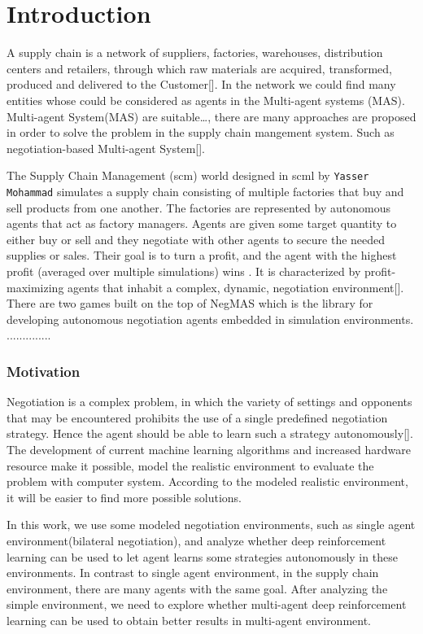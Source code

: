 \chapter{Introduction}
A supply chain is a network of suppliers, factories, warehouses, distribution centers and retailers, through which raw materials are acquired, transformed, produced and delivered to the Customer[]. In the network we could find many entities whose could be considered as agents in the Multi-agent systems (MAS). Multi-agent System(MAS) are suitable…, there are many approaches are proposed in order to solve the problem in the supply chain mangement system. Such as negotiation-based Multi-agent System[].

The Supply Chain Management (\gls{scm}) world designed in \gls{scml} by \texttt{Yasser Mohammad} simulates a supply chain consisting of multiple factories that buy and sell products from one another. The factories are represented by autonomous agents that act as factory managers. Agents are given some target quantity to either buy or sell and they negotiate with other agents to secure the needed supplies or sales. Their goal is to turn a profit, and the agent with the highest profit (averaged over multiple simulations) wins \parencite{Mohammad2019}. It is characterized by profit-maximizing agents that inhabit a complex, dynamic, negotiation environment[]. There are two games built on the top of NegMAS which is the library for developing autonomous negotiation agents embedded in simulation environments.
..............

\subsection{Motivation}
Negotiation is a complex problem, in which the variety of settings and opponents that may be encountered prohibits the use of a single predefined negotiation strategy. Hence the agent should be able to learn such a strategy autonomously[]. The development of current machine learning algorithms and increased hardware resource make it possible, model the realistic environment to evaluate the problem with computer system. According to the modeled realistic environment, it will be easier to find more possible solutions.

In this work, we use some modeled negotiation environments, such as single agent environment(bilateral negotiation), and analyze whether deep reinforcement learning can be used to let agent learns some strategies autonomously in these environments. In contrast to single agent environment, in the supply chain environment, there are many agents with the same goal. After analyzing the simple environment, we need to explore whether multi-agent deep reinforcement learning can be used to obtain better results in multi-agent environment.

